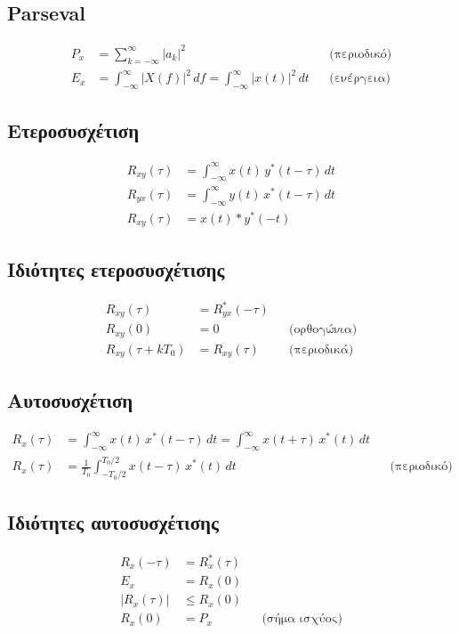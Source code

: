 \documentclass[11pt,a4paper]{article}
\begin{document}
\subsection{Parseval}
\begin{align}
P_x &= \sum_{k=-\infty}^{\infty} |a_k|^2 && \text{(περιοδικό)} \\
E_x &= \int_{-\infty}^{\infty} |X(f)|^2\,df = \int_{-\infty}^{\infty} |x(t)|^2\,dt && \text{(ενέργεια)}
\end{align}

\subsection{Ετεροσυσχέτιση}
\begin{align}
R_{xy}(\tau) &= \int_{-\infty}^{\infty} x(t)\,y^*(t-\tau)\,dt \\
R_{yx}(\tau) &= \int_{-\infty}^{\infty} y(t)\,x^*(t-\tau)\,dt \\
R_{xy}(\tau) &= x(t) \ast y^*(-t)
\end{align}

\subsection{Ιδιότητες ετεροσυσχέτισης}
\begin{align}
R_{xy}(\tau) &= R_{yx}^*(-\tau) \\
R_{xy}(0) &= 0 && \text{(ορθογώνια)} \\
R_{xy}(\tau + kT_0) &= R_{xy}(\tau) && \text{(περιοδικά)}
\end{align}

\subsection{Αυτοσυσχέτιση}
\begin{align}
R_x(\tau) &= \int_{-\infty}^{\infty} x(t)\,x^*(t-\tau)\,dt
           = \int_{-\infty}^{\infty} x(t+\tau)\,x^*(t)\,dt \\
R_x(\tau) &= \frac{1}{T_0}\int_{-T_0/2}^{T_0/2} x(t-\tau)\,x^*(t)\,dt && \text{(περιοδικό)}
\end{align}

\subsection{Ιδιότητες αυτοσυσχέτισης}
\begin{align}
R_x(-\tau) &= R_x^*(\tau) \\
E_x &= R_x(0) \\
|R_x(\tau)| &\le R_x(0) \\
R_x(0) &= P_x && \text{(σήμα ισχύος)}
\end{align}
\end{document}
